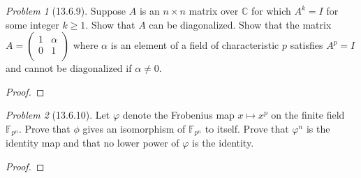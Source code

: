 \documentclass[10pt]{article}
\newcommand{\sk}{\vskip 10mm}
\newcommand{\bb}[1]{\mathbb{#1}}
\theoremstyle{remark}
\newtheorem{problem}{Problem}
\theoremstyle{remark}
\begin{document}
\begin{problem}[13.6.9]
  Suppose $A$ is an $n\times n$ matrix over $\bb{C}$ for which $A^k=I$
  for some integer $k\geq1$. Show that $A$ can be diagonalized.
  Show that the matrix
  $A=\left(\begin{array}{cc}1&\alpha\\0&1\\ \end{array}\right)$
  where $\alpha$ is an element of a field of characteristic $p$ satisfies
  $A^p=I$ and cannot be diagonalized if $\alpha\neq 0$.
\end{problem}

\begin{proof}
  
\end{proof}

\sk

\begin{problem}[13.6.10]
  Let $\varphi$ denote the Frobenius map $x\mapsto x^p$ on the finite field
  $\bb{F}_{p^n}$. Prove that $\phi$ gives an isomorphism of $\bb{F}_{p^n}$
  to itself. Prove that $\varphi^n$ is the identity map and that no
  lower power of $\varphi$ is the identity.
\end{problem}

\begin{proof}
  
\end{proof}

\sk
\end{document}

